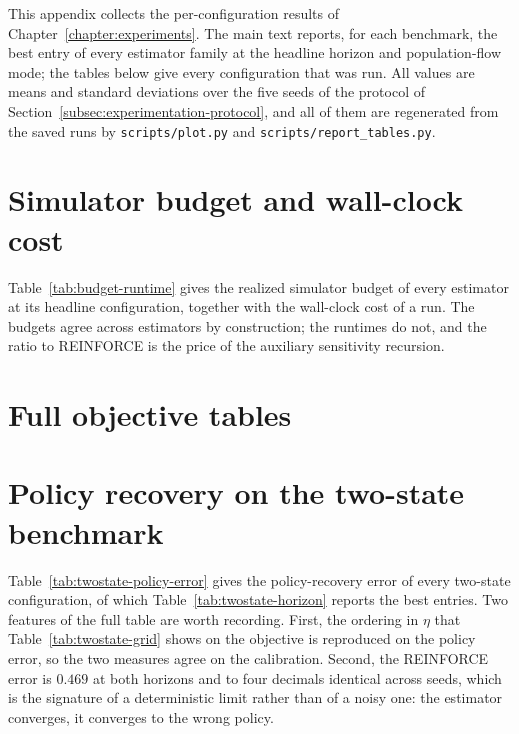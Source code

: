 This appendix collects the per-configuration results of Chapter~\ref{chapter:experiments}. The main text reports, for each benchmark, the best entry of every estimator family at the headline horizon and population-flow mode; the tables below give every configuration that was run. All values are means and standard deviations over the five seeds of the protocol of Section~\ref{subsec:experimentation-protocol}, and all of them are regenerated from the saved runs by \texttt{scripts/plot.py} and \texttt{scripts/report\_tables.py}.

\section{Simulator budget and wall-clock cost}
\label{appendix:budget-runtime}

Table~\ref{tab:budget-runtime} gives the realized simulator budget of every estimator at its headline configuration, together with the wall-clock cost of a run. The budgets agree across estimators by construction; the runtimes do not, and the ratio to REINFORCE is the price of the auxiliary sensitivity recursion.



\section{Full objective tables}
\label{appendix:full-objectives}













\section{Policy recovery on the two-state benchmark}
\label{appendix:twostate-policy-error}

Table~\ref{tab:twostate-policy-error} gives the policy-recovery error of every two-state configuration, of which Table~\ref{tab:twostate-horizon} reports the best entries. Two features of the full table are worth recording. First, the ordering in $\eta$ that Table~\ref{tab:twostate-grid} shows on the objective is reproduced on the policy error, so the two measures agree on the calibration. Second, the REINFORCE error is $0.469$ at both horizons and to four decimals identical across seeds, which is the signature of a deterministic limit rather than of a noisy one: the estimator converges, it converges to the wrong policy.


